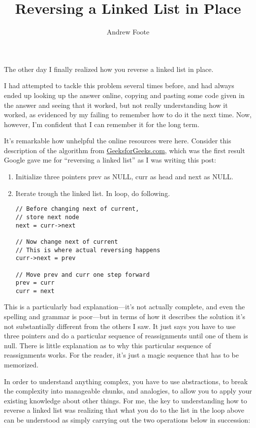 \documentclass{amsart}
\title{Reversing a Linked List in Place}
\author{Andrew Foote}
\begin{document}
\maketitle

The other day I finally realized how you reverse a linked list in place.

I had attempted to tackle this problem several times before, and had always ended up looking up the answer online, copying and pasting some code given in the answer and seeing that it worked, but not really understanding how it worked, as evidenced by my failing to remember how to do it the next time. Now, however, I'm confident that I can remember it for the long term.

It's remarkable how unhelpful the online resources were here. Consider this description of the algorithm from \href{https://www.geeksforgeeks.org/reverse-a-linked-list/}{GeeksforGeeks.com}, which was the first result Google gave me for ``reversing a linked list'' as I was writing this post:

\begin{displayquote}
\begin{enumerate}
\item Initialize three pointers prev as NULL, curr as head and next as NULL.
\item Iterate trough the linked list. In loop, do following.
\begin{verbatim}
// Before changing next of current,
// store next node
next = curr->next

// Now change next of current
// This is where actual reversing happens
curr->next = prev

// Move prev and curr one step forward
prev = curr
curr = next
\end{verbatim}
\end{enumerate}
\end{displayquote}

This is a particularly bad explanation---it's not actually complete, and even the spelling and grammar is poor---but in terms of how it describes the solution it's not substantially different from the others I saw. It just says you have to use three pointers and do a particular sequence of reassignments until one of them is null. There is little explanation as to why this particular sequence of reassignments works. For the reader, it's just a magic sequence that has to be memorized.

In order to understand anything complex, you have to use abstractions, to break the complexity into manageable chunks, and analogies, to allow you to apply your existing knowledge about other things. For me, the key to understanding how to reverse a linked list was realizing that what you do to the list in the loop above can be understood as simply carrying out the two operations below in succession:
\end{document}
